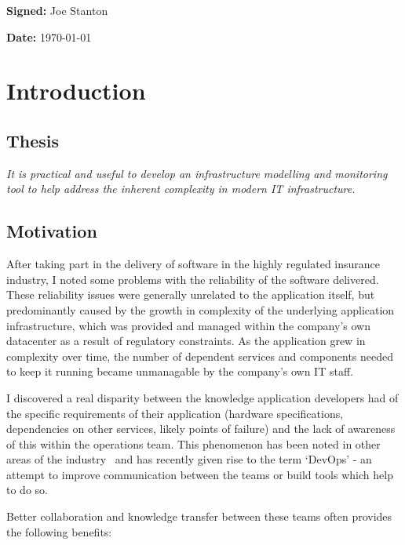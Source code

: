 \documentclass{cshonours}
\begin{document}
\textbf{Signed:} Joe Stanton 

\textbf{Date:} \today


\tableofcontents

\chapter{Introduction}

\section{Thesis}
\textit{It is practical and useful to develop an infrastructure modelling and monitoring tool to help address the inherent complexity in modern IT infrastructure.}
\section{Motivation}

After taking part in the delivery of software in the highly regulated insurance industry, I noted some problems with the reliability of the software delivered. These reliability issues were generally unrelated to the application itself, but predominantly caused by the growth in complexity of the underlying application infrastructure, which was provided and managed within the company's own datacenter as a result of regulatory constraints. As the application grew in complexity over time, the number of dependent services and components needed to keep it running became unmanagable by the company's own IT staff.

I discovered a real disparity between the knowledge application developers had of the specific requirements of their application (hardware specifications, dependencies on other services, likely points of failure) and the lack of awareness of this within the operations team. This phenomenon has been noted in other areas of the industry~\cite{DevOps} and has recently given rise to the term `DevOps' - an attempt to improve communication between the teams or build tools which help to do so.

Better collaboration and knowledge transfer between these teams often provides the following benefits:
\end{document}
